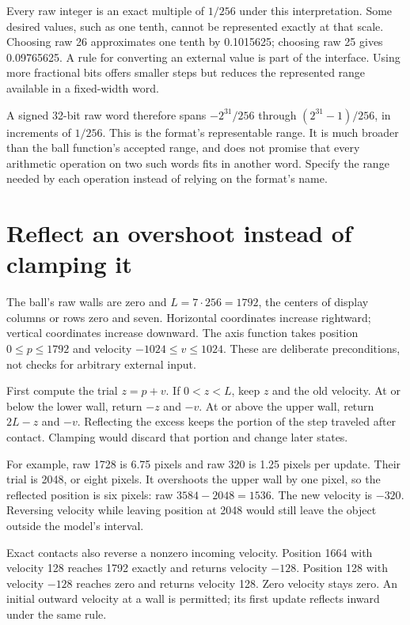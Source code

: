 \begin{samepage}
  Every raw integer is an exact multiple of $1/256$ under this interpretation.
  Some desired values, such as one tenth, cannot be represented exactly at that
  scale. Choosing raw 26 approximates one tenth by 0.1015625; choosing raw 25 gives
  0.09765625. A rule for converting an external value is part of the interface.
  Using more fractional bits offers smaller steps but reduces the represented
  range available in a fixed-width word.
  \par
\end{samepage}

A signed 32-bit raw word therefore spans $-2^{31}/256$ through
$(2^{31}-1)/256$, in increments of $1/256$. This is the format's representable
range. It is much broader than the ball function's accepted range, and does not
promise that every arithmetic operation on two such words fits in another word.
Specify the range needed by each operation instead of relying on the format's name.

\section{Reflect an overshoot instead of clamping it}

The ball's raw walls are zero and $L=7\cdot256=1792$, the centers of display
columns or rows zero and seven. Horizontal coordinates increase rightward;
vertical coordinates increase downward. The axis function takes position
$0\leq p\leq1792$ and velocity $-1024\leq v\leq1024$. These are deliberate
preconditions, not checks for arbitrary external input.

First compute the trial $z=p+v$. If $0<z<L$, keep $z$ and the old velocity.
At or below the lower wall, return $-z$ and $-v$. At or above the upper wall,
return $2L-z$ and $-v$. Reflecting the excess keeps the portion of the step
traveled after contact. Clamping would discard that portion and change later states.

For example, raw 1728 is 6.75 pixels and raw 320 is 1.25 pixels per update.
Their trial is 2048, or eight pixels. It overshoots the upper wall by one pixel,
so the reflected position is six pixels: raw $3584-2048=1536$. The new velocity
is $-320$. Reversing velocity while leaving position at 2048 would still leave
the object outside the model's interval.



Exact contacts also reverse a nonzero incoming velocity. Position 1664 with
velocity 128 reaches 1792 exactly and returns velocity $-128$. Position 128
with velocity $-128$ reaches zero and returns velocity 128. Zero velocity stays
zero. An initial outward velocity at a wall is permitted; its first update
reflects inward under the same rule.

